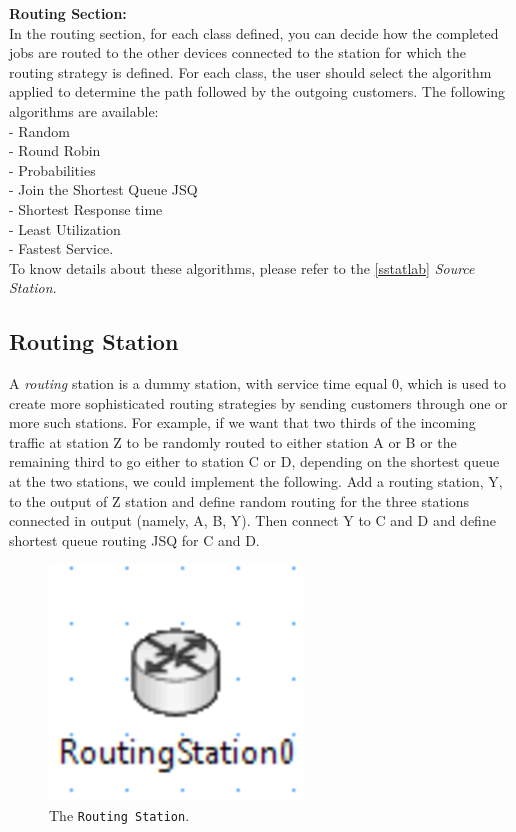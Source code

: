\noindent \textbf{Routing Section:}\\ In the routing section, for each class
defined, you can decide how the completed jobs are routed to the
other devices connected to the station for which the routing
strategy is defined.
For each class, the user should select the algorithm applied to
determine the path followed by the outgoing customers.
The following algorithms are available:\\
- Random\\  - Round Robin\\ - Probabilities\\   - Join the Shortest Queue JSQ\\
- Shortest Response time\\ - Least Utilization\\  - Fastest Service.\\

\noindent To know details about these algorithms, please refer to the
\autoref{sstatlab} \emph{Source Station}.


\subsection{Routing Station}
 A \emph{routing} station is a dummy
station, with service time equal 0, which is used to create more
sophisticated routing strategies by sending customers through one
or more such stations. For example, if we want that two thirds of
the incoming traffic at station Z to be randomly routed to either
station A or B or the remaining third to go either to station C or
D, depending on the shortest queue at the two stations, we could
implement the following. Add a routing station, Y, to the output
of Z station and define random routing for the three stations
connected in output (namely, A, B, Y). Then connect Y to C and D
and define
shortest queue routing JSQ for C and D.\\
\begin{figure}[htb]
    \begin{center}
        \includegraphics[scale=.5]{img/jsimg/8.26.eps}
    \end{center}
    \caption{The \texttt{Routing Station}.}
    \label{fig:routstat}
\end{figure}

